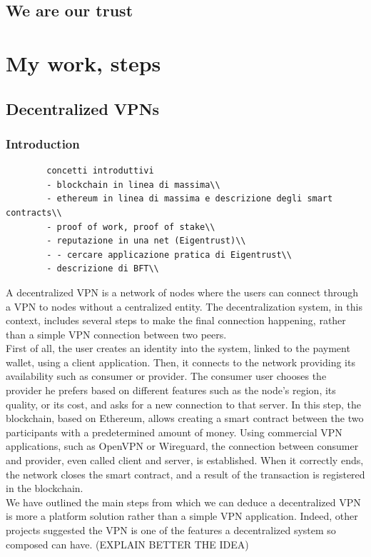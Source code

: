 \documentclass[]{article}
\begin{document}
	\subsection{We are our trust}


	\section{My work, steps}
	\subsection{Decentralized VPNs}
	\subsubsection{Introduction}
		
	\begin{verbatim}
		concetti introduttivi
		- blockchain in linea di massima\\
		- ethereum in linea di massima e descrizione degli smart contracts\\
		- proof of work, proof of stake\\
		- reputazione in una net (Eigentrust)\\
		- - cercare applicazione pratica di Eigentrust\\
		- descrizione di BFT\\
	\end{verbatim}

	A decentralized VPN is a network of nodes where the users can connect through a VPN to nodes without a centralized entity. The decentralization system, in this context, includes several steps to make the final connection happening, rather than a simple VPN connection between two peers.\\
	First of all, the user creates an identity into the system, linked to the payment wallet, using a client application. Then, it connects to the network providing its availability such as consumer or provider. The consumer user chooses the provider he prefers based on different features such as the node's region, its quality, or its cost, and asks for a new connection to that server. In this step, the blockchain, based on Ethereum, allows creating a smart contract between the two participants with a predetermined amount of money. Using commercial VPN applications, such as OpenVPN or Wireguard, the connection between consumer and provider, even called client and server, is established. When it correctly ends, the network closes the smart contract, and a result of the transaction is registered in the blockchain. \\
	We have outlined the main steps from which we can deduce a decentralized VPN is more a platform solution rather than a simple VPN application. Indeed, other projects suggested the VPN is one of the features a decentralized system so composed can have. (EXPLAIN BETTER THE IDEA)  
		          
\end{document}

